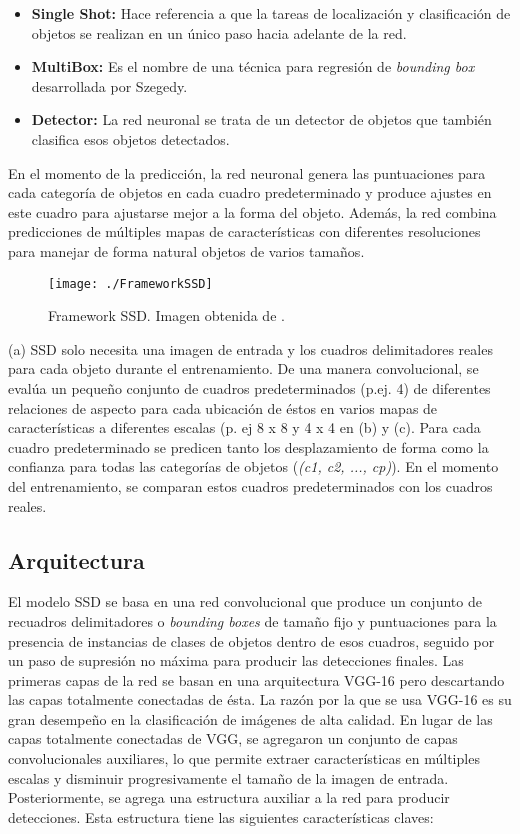 \documentclass[a4paper, 12pt, oneside]{book}
\begin{document}
\begin{itemize}
\item \textbf{Single Shot:}  Hace referencia a que la tareas de localización y clasificación de objetos se realizan en un único paso hacia adelante de la red.
\item \textbf{MultiBox:} Es el nombre de una técnica para regresión de \textit{bounding box} desarrollada por Szegedy.
\item \textbf{Detector:} La red neuronal se trata de un detector de objetos que también clasifica esos objetos detectados.
\end{itemize}

En el momento de la predicción, la red neuronal genera las puntuaciones para cada categoría de objetos en cada cuadro predeterminado y produce ajustes en este cuadro para ajustarse mejor a la forma del objeto. Además, la red combina predicciones de múltiples mapas de características con diferentes resoluciones para manejar de forma natural objetos de varios tamaños.

\begin{figure}[H]
\begin{center}
\texttt{[image: ./FrameworkSSD]}
\caption{Framework SSD. Imagen obtenida de \cite{SSD}.}
\label{FrameworkSSD}
\end{center}
\end{figure}

(a) SSD solo necesita una imagen de entrada y los cuadros delimitadores reales para cada objeto durante el entrenamiento. De una manera convolucional, se evalúa un pequeño conjunto de cuadros predeterminados (p.ej. 4) de diferentes relaciones de aspecto para cada ubicación de éstos en varios mapas de características a diferentes escalas (p. ej 8 x 8 y 4 x 4 en (b) y (c). Para cada cuadro predeterminado se predicen tanto los desplazamiento de forma como la confianza para todas las categorías de objetos (\textit{(c1, c2, ..., cp)}). En el momento del entrenamiento, se comparan estos cuadros predeterminados con los cuadros reales.

\subsection{Arquitectura}\label{ArquitecturaSSDSection}

El modelo SSD se basa en una red convolucional que produce un conjunto de recuadros delimitadores o \textit{bounding boxes} de tamaño fijo y puntuaciones para la presencia de instancias de clases de objetos dentro de esos cuadros, seguido por un paso de supresión no máxima para producir las detecciones finales. Las primeras capas de la red se basan en una arquitectura VGG-16 pero descartando las capas totalmente conectadas de ésta. La razón por la que se usa VGG-16 es su gran desempeño en la clasificación de imágenes de alta calidad. En lugar de las capas totalmente conectadas de VGG, se agregaron un conjunto de capas convolucionales auxiliares, lo que permite extraer características en múltiples escalas y disminuir progresivamente el tamaño de la imagen de entrada. Posteriormente, se agrega una estructura auxiliar a la red para producir detecciones. Esta estructura tiene las siguientes características claves:
\end{document}
